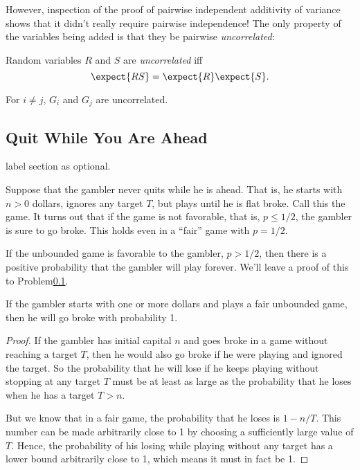 However, inspection of the proof of pairwise independent additivity of
variance shows that it didn't really require pairwise independence!  The
only property of the variables being added is that they be pairwise
\emph{uncorrelated}:

\begin{definition*}
Random variables $R$ and $S$ are \emph{uncorrelated} iff
\begin{equation}\label{LN12:uncor}
\expect{RS} = \expect{R}\expect{S}.
\end{equation}
\end{definition*}

\begin{lemma}\label{LN12:Guncor}
For $i \neq j$, $G_i$ and $G_j$ are uncorrelated.
\end{lemma}
\fi

\subsection{Quit While You Are Ahead}

\begin{editingnotes}
label section as optional.
\end{editingnotes}

Suppose that the gambler never quits while he is ahead.  That is, he
starts with $n>0$ dollars, ignores any target $T$, but plays until he
is flat broke.  Call this the  game.
It turns out that if the game is not favorable, that is, $p \leq 1/2$,
the gambler is sure to go broke.  This holds even in a ``fair''
game with $p = 1/2$.

\begin{editingnotes}
If the unbounded game is favorable to the gambler, \ie $p>1/2$, then
there is a positive probability that the gambler will play forever.
We'll leave a proof of this to Problem\ref{}.
\end{editingnotes}

\begin{lemma}\label{LN12:go broke}
If the gambler starts with one or more dollars and plays a fair
unbounded game, then he will go broke with probability 1.
\end{lemma}

\begin{proof}
If the gambler has initial capital $n$ and goes broke in a game without
reaching a target $T$, then he would also go broke if he were playing and
ignored the target.  So the probability that he will lose if he keeps
playing without stopping at any target $T$ must be at least as large as the
probability that he loses when he has a target $T>n$.

But we know that in a fair game, the probability that he loses is $1 -
n/T$.  This number can be made arbitrarily close to 1 by choosing a
sufficiently large value of $T$.  Hence, the probability of his losing
while playing without any target has a lower bound arbitrarily close to 1,
which means it must in fact be 1.
\end{proof}

